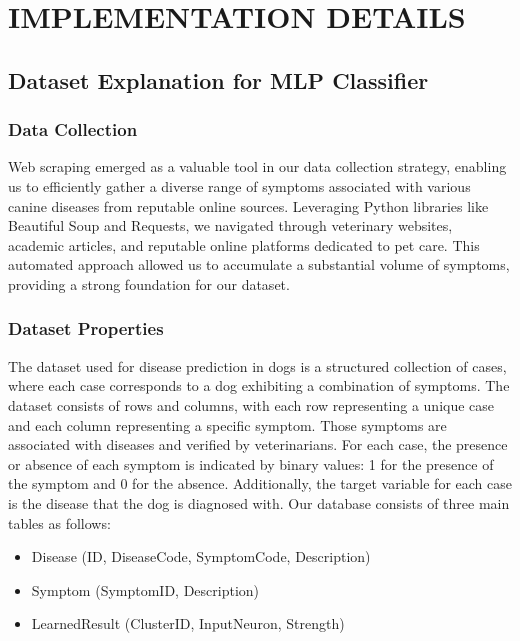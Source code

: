 \section{IMPLEMENTATION DETAILS}

\subsection{Dataset Explanation for MLP Classifier}

\subsubsection{Data Collection}
Web scraping emerged as a valuable tool in our data collection strategy, enabling us to
efficiently gather a diverse range of symptoms associated with various canine diseases
from reputable online sources. Leveraging Python libraries like Beautiful Soup and
Requests, we navigated through veterinary websites, academic articles, and reputable online platforms dedicated to pet care. This automated approach allowed us to accumulate a substantial volume of symptoms, providing a strong foundation for our dataset.

\subsubsection{Dataset Properties}
The dataset used for disease prediction in dogs is a structured collection of cases, where each case corresponds to a dog exhibiting a combination of symptoms. The dataset consists of rows and columns, with each row representing a unique case and each column representing a specific symptom. Those symptoms are associated with
diseases and verified by veterinarians. For each case, the presence or absence of each symptom is indicated by binary values: 1 for the presence of the symptom and 0 for the absence. Additionally, the target variable for each case is the disease that the dog is diagnosed with. Our database consists of three main tables as follows:

\begin{itemize}
\item Disease (ID, DiseaseCode, SymptomCode, Description)
\item Symptom (SymptomID, Description)
\item LearnedResult (ClusterID, InputNeuron, Strength)
\end{itemize}

